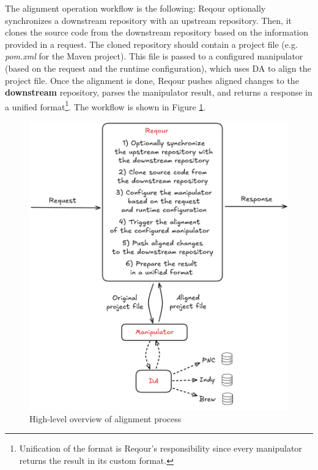 \documentclass[../main.tex]{subfiles}
\begin{document}
The alignment operation workflow is the following: Reqour optionally synchronizes a downstream repository with an upstream repository. Then, it clones the source code from the downstream repository based on the information provided in a request. The cloned repository should contain a project file (e.g. \textit{pom.xml} for the Maven project). This file is passed to a configured manipulator (based on the request and the runtime configuration), which uses DA to align the project file. Once the alignment is done, Reqour pushes aligned changes to the \textbf{downstream} repository, parses the manipulator result, and returns a response in a unified format\footnote{Unification of the format is Reqour's responsibility since every manipulator returns the result in its custom format.}.
The workflow is shown in Figure \ref{fig:alignment-process}.

\begin{figure}
  \begin{center}
    \includegraphics[width=\textwidth]{images/alignment-process.png}
  \end{center}
  \caption{High-level overview of alignment process}
  \label{fig:alignment-process}
\end{figure}
\end{document}
